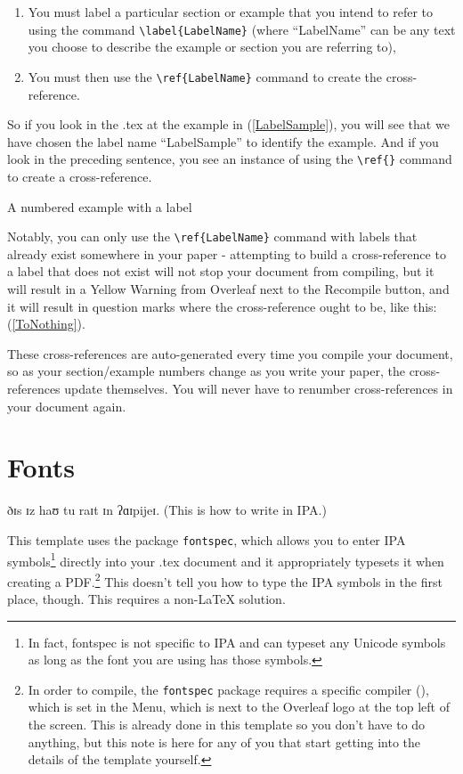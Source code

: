 \documentclass{article}
\begin{document}
\begin{enumerate}    

\item You must label a particular section or example that you intend to refer to using the command \verb|\label{LabelName}| (where ``LabelName'' can be any text you choose to describe the example or section you are referring to), 
    
\item You must then use the \verb|\ref{LabelName}| command to create the cross-reference. 

\end{enumerate}

\noindent So if you look in the .tex at the example in (\ref{LabelSample}), you will see that we have chosen the label name ``LabelSample'' to identify the example. And if you look in the preceding sentence, you see an instance of using the \verb|\ref{}| command to create a cross-reference.

\ea \label{LabelSample}
A numbered example with a label 
\z

Notably, you can only use the \verb|\ref{LabelName}| command with labels that already exist somewhere in your paper - attempting to build a cross-reference to a label that does not exist will not stop your document from compiling, but it will result in a Yellow Warning from Overleaf next to the Recompile button, and it will result in question marks where the cross-reference ought to be, like this: (\ref{ToNothing}). %

These cross-references are auto-generated every time you compile your document, so as your section/example numbers change as you write your paper, the cross-references update themselves. You will never have to renumber cross-references in your document again. %

\section{Fonts} \label{SectFonts}

\ea 
ðɪs ɪz haʊ tu raɪt ɪn ʔɑɪpijeɪ. (This is how to write in IPA.)
\z 

\noindent This template uses the package \texttt{fontspec}, which allows you to enter IPA symbols\footnote{In fact, fontspec is not specific to IPA and can typeset any Unicode symbols as long as the font you are using has those symbols.} directly into your .tex document and it appropriately typesets it when creating a PDF.\footnote{In order to compile, the \texttt{fontspec} package requires a specific compiler (\XeLaTeX{}), which is set in the Menu, which is next to the Overleaf logo at the top left of the screen. This is already done in this template so you don't have to do anything, but this note is here for any of you that start getting into the details of the template yourself.} This doesn't tell you how to type the IPA symbols in the first place, though. This requires a non-\LaTeX{} solution.
\end{document}
